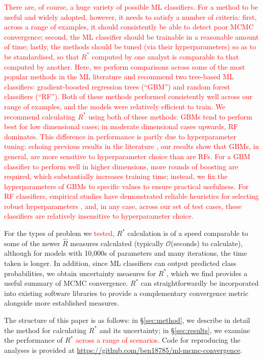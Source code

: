 \documentclass{article}
\begin{document}
\textcolor{red}{There are, of course, a huge variety of possible ML classifiers. For a method to be useful and widely adopted, however, it needs to satisfy a number of criteria: first, across a range of examples, it should consistently be able to detect poor MCMC convergence; second, the ML classifier should be trainable in a reasonable amount of time; lastly, the methods should be tuned (via their hyperparameters) so as to be standardised, so that $R^*$ computed by one analyst is comparable to that computed by another. Here, we perform comparisons across some of the most popular methods in the ML literature and recommend two tree-based ML classifiers: gradient-boosted regression trees \citep{friedman2001greedy,greenwell2019package} (``GBM'') and random forest classifiers \citep{breiman2001random} (``RF''). Both of these methods performed consistently well across our range of examples, and the models were relatively efficient to train. We recommend calculating $R^*$ using both of these methods: GBMs tend to perform best for low dimensional cases; in moderate dimensional cases upwards, RF dominates. This difference in performance is partly due to hyperparameter tuning: echoing previous results in the literature \cite[Chapters~11\&12]{boehmke2019hands}, our results show that GBMs, in general, are more sensitive to hyperparameter choice than are RFs. For a GBM classifier to perform well in higher dimensions, more rounds of boosting are required, which substantially increases training time; instead, we fix the hyperparameters of GBMs to specific values to ensure practical usefulness. For RF classifiers, empirical studies have demonstrated reliable heuristics for selecting robust hyperparameters \citep{bernard2009influence}, and, in any case, across our set of test cases, these classifiers are relatively insensitive to hyperparameter choice.}

For the types of problem we \textcolor{red}{tested}, $R^*$ calculation is of a speed comparable to some of the newer $\widehat{R}$ measures calculated (typically $\mathcal{O}$(seconds) to calculate), although for models with 10,000s of parameters and many iterations, the time taken is longer. In addition, since ML classifiers can output predicted class probabilities, we obtain uncertainty measures for $R^*$, which we find provides a useful summary of MCMC convergence. $R^*$ can straightforwardly be incorporated into existing software libraries to provide a complementary convergence metric alongside more established measures.

The structure of this paper is as follows: in \S\ref{sec:method}, we describe in detail the method for calculating $R^*$ and its uncertainty; in \S\ref{sec:results}, we examine the performance of $R^*$ \textcolor{red}{across a range of scenarios}. Code for reproducing the analyses is provided at \url{https://github.com/ben18785/ml-mcmc-convergence}.
\end{document}
